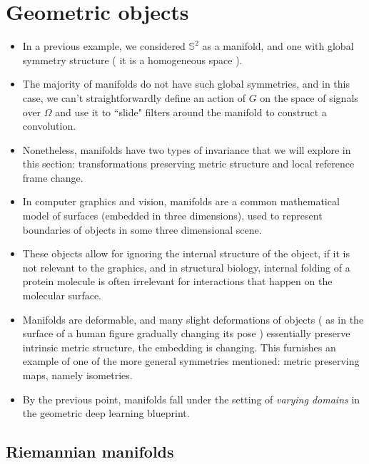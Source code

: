 \documentclass[12pt]{article}
\numberwithin{equation}{section}
\theoremstyle{definition}
\newcommand{		\bbS		}	{	\mathbb{S}				}
\newcommand{		\1		}	{	\bm{1}					}%
\begin{document}
\newpage

\section{Geometric objects}


\begin{itemize}
\item In a previous example, we considered $\bbS^2$ as a manifold, and one with global symmetry structure ( it is a homogeneous space ). 
\item The majority of manifolds do not have such global symmetries, and in this case, we can't straightforwardly define an action of $G$ on the space of signals over $\Omega$ and use it to ``slide" filters around the manifold to construct a convolution. 
\item Nonetheless, manifolds have two types of invariance that we will explore in this section: transformations preserving metric structure and local reference frame change. 
\item In computer graphics and vision, manifolds are a common mathematical model of surfaces (embedded in three dimensions), used to represent boundaries of objects in some three dimensional scene. 
\item These objects allow for ignoring the internal structure of the object, if it is not relevant to the graphics, and in structural biology, internal folding of a protein molecule is often irrelevant for interactions that happen on the molecular surface. 
\item Manifolds are deformable, and many slight deformations of objects ( as in the surface of a human figure gradually changing its pose ) essentially preserve intrinsic metric structure, the embedding is changing. This furnishes an example of one of the more general symmetries mentioned: metric preserving maps, namely isometries.
\item By the previous point, manifolds fall under the setting of \emph{varying domains} in the geometric deep learning blueprint.
\end{itemize}

\subsection{Riemannian manifolds}
\end{document}
